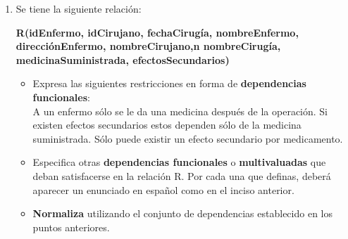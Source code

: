 \documentclass{article}
\begin{document}
\begin{enumerate}
\begin{itemize}
\begin{enumerate}
    	\end{enumerate}
    \end{itemize}
    
    	\item Se tiene la siguiente relación:   	
    	\begin{center}
    		 \textbf{R(idEnfermo, idCirujano, fechaCirugía, nombreEnfermo, direcciónEnfermo, nombreCirujano,n nombreCirugía, medicinaSuministrada, efectosSecundarios)}
    	\end{center}	 
    	
    	\begin{itemize}
    	\item Expresa las siguientes restricciones en forma de \textbf{dependencias funcionales}:\\
    	A un enfermo sólo se le da una medicina después de la operación. Si existen efectos secundarios estos dependen sólo de la medicina suministrada. Sólo puede existir un efecto secundario por medicamento.
    	\item Especifica  otras \textbf{dependencias  funcionales} o \textbf{multivaluadas} que  deban  satisfacerse  en  la relación R. Por cada una que definas, deberá aparecer un enunciado en español como en el inciso anterior.
    	\item \textbf{Normaliza} utilizando el conjunto de dependencias establecido en los puntos anteriores.
    \end{itemize}
    	
\end{enumerate}
\end{document}
